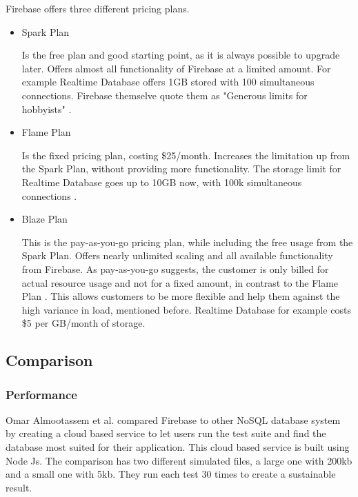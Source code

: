 Firebase offers three different pricing plans.
\begin{itemize}
    \item Spark Plan
    
    Is the free plan and good starting point, as it is always possible to upgrade later. Offers almost all functionality of Firebase at a limited amount. For example Realtime Database offers 1GB stored with 100 simultaneous connections. Firebase themselve quote them as "Generous limits for hobbyists" \cite{FirebasePricing}.
    
    \item Flame Plan
    
    Is the fixed pricing plan, costing \$25/month. Increases the limitation up from the Spark Plan, without providing more functionality. The storage limit for Realtime Database goes up to 10GB now, with 100k simultaneous connections \cite{FirebasePricing}.
    
    \item Blaze Plan
    
    This is the pay-as-you-go pricing plan, while including the free usage from the Spark Plan. Offers nearly unlimited scaling and all available functionality from Firebase. As pay-as-you-go suggests, the customer is only billed for actual resource usage and not for a fixed amount, in contrast to the Flame Plan \cite{FirebasePricing}. This allows customers to be more flexible and help them against the high variance in load, mentioned before. Realtime Database for example costs \$5 per GB/month of storage. 
\end{itemize}

\subsection{Comparison}
\subsubsection{Performance}
Omar Almootassem et al. \cite{almootassem2017cloud} compared Firebase to other NoSQL database system by creating a cloud based service to let users run the test suite and find the database most suited for their application. This cloud based service is built using Node Js. The comparison has two different simulated files, a large one with 200kb and a small one with 5kb. They run each test 30 times to create a sustainable result.

